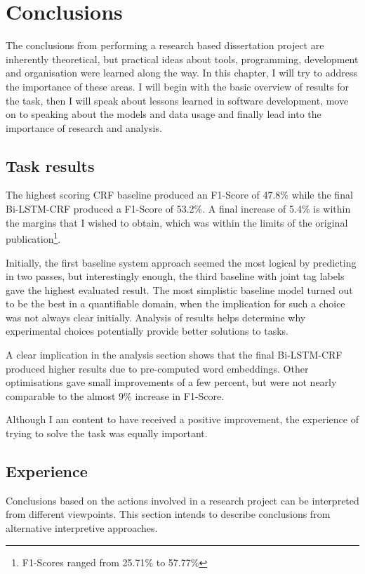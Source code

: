 \chapter{Conclusions}\label{chapter6}

The conclusions from performing a research based dissertation project are inherently theoretical, but practical ideas about tools, programming, development and organisation were learned along the way. In this chapter, I will try to address the importance of these areas. I will begin with the basic overview of results for the task, then I will speak about lessons learned in software development, move on to speaking about the models and data usage and finally lead into the importance of research and analysis.

\section{Task results}

The highest scoring CRF baseline produced an F1-Score of 47.8\% while the final Bi-LSTM-CRF produced a F1-Score of 53.2\%. A final increase of 5.4\% is within the margins that I wished to obtain, which was within the limits of the original \dimsum publication\footnote{F1-Scores ranged from 25.71\% to 57.77\%}.

Initially, the first baseline system approach seemed the most logical by predicting in two passes, but interestingly enough, the third baseline with joint tag labels gave the highest evaluated result. The most simplistic baseline model turned out to be the best in a quantifiable domain, when the implication for such a choice was not always clear initially. Analysis of results helps determine why experimental choices potentially provide better solutions to tasks. 

A clear implication in the analysis section shows that the final Bi-LSTM-CRF produced higher results due to pre-computed word embeddings. Other optimisations gave small improvements of a few percent, but were not nearly comparable to the almost 9\% increase in F1-Score. 

Although I am content to have received a positive improvement, the experience of trying to solve the \dimsum task was equally important.

\section{Experience}

Conclusions based on the actions involved in a research project can be interpreted from different viewpoints. This section intends to describe conclusions from alternative interpretive approaches.

